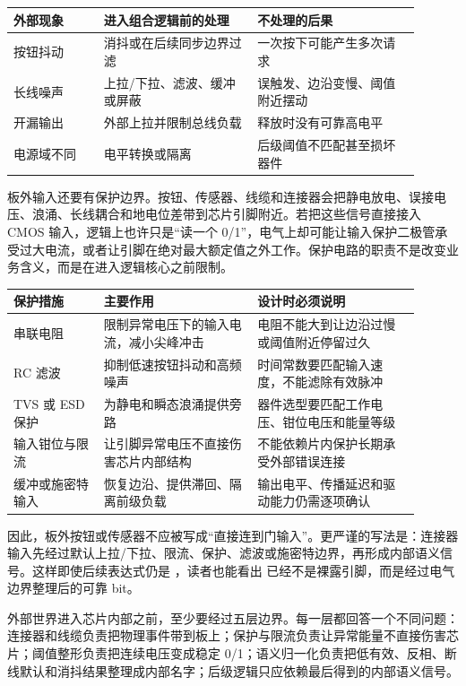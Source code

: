 \begin{longtable}{L{0.2\linewidth}L{0.34\linewidth}L{0.36\linewidth}}
\toprule
外部现象 & 进入组合逻辑前的处理 & 不处理的后果 \\
\midrule
按钮抖动 & 消抖或在后续同步边界过滤 & 一次按下可能产生多次请求 \\\tablerowrule
长线噪声 & 上拉/下拉、滤波、缓冲或屏蔽 & 误触发、边沿变慢、阈值附近摆动 \\\tablerowrule
开漏输出 & 外部上拉并限制总线负载 & 释放时没有可靠高电平 \\\tablerowrule
电源域不同 & 电平转换或隔离 & 后级阈值不匹配甚至损坏器件 \\
\bottomrule
\end{longtable}

板外输入还要有保护边界。按钮、传感器、线缆和连接器会把静电放电、误接电压、浪涌、长线耦合和地电位差带到芯片引脚附近。若把这些信号直接接入 CMOS 输入，逻辑上也许只是“读一个 0/1”，电气上却可能让输入保护二极管承受过大电流，或者让引脚在绝对最大额定值之外工作。保护电路的职责不是改变业务含义，而是在进入逻辑核心之前限制。

\begin{longtable}{L{0.2\linewidth}L{0.34\linewidth}L{0.36\linewidth}}
\toprule
保护措施 & 主要作用 & 设计时必须说明 \\
\midrule
串联电阻 & 限制异常电压下的输入电流，减小尖峰冲击 & 电阻不能大到让边沿过慢或阈值附近停留过久 \\\tablerowrule
RC 滤波 & 抑制低速按钮抖动和高频噪声 & 时间常数要匹配输入速度，不能滤除有效脉冲 \\\tablerowrule
TVS 或 ESD 保护 & 为静电和瞬态浪涌提供旁路 & 器件选型要匹配工作电压、钳位电压和能量等级 \\\tablerowrule
输入钳位与限流 & 让引脚异常电压不直接伤害芯片内部结构 & 不能依赖片内保护长期承受外部错误连接 \\\tablerowrule
缓冲或施密特输入 & 恢复边沿、提供滞回、隔离前级负载 & 输出电平、传播延迟和驱动能力仍需逐项确认 \\
\bottomrule
\end{longtable}

因此，板外按钮或传感器不应被写成“直接连到门输入”。更严谨的写法是：连接器输入先经过默认上拉/下拉、限流、保护、滤波或施密特边界，再形成内部语义信号。这样即使后续表达式仍是 ，读者也能看出  已经不是裸露引脚，而是经过电气边界整理后的可靠 bit。

外部世界进入芯片内部之前，至少要经过五层边界。每一层都回答一个不同问题：连接器和线缆负责把物理事件带到板上；保护与限流负责让异常能量不直接伤害芯片；阈值整形负责把连续电压变成稳定 0/1；语义归一化负责把低有效、反相、断线默认和消抖结果整理成内部名字；后级逻辑只应依赖最后得到的内部语义信号。

